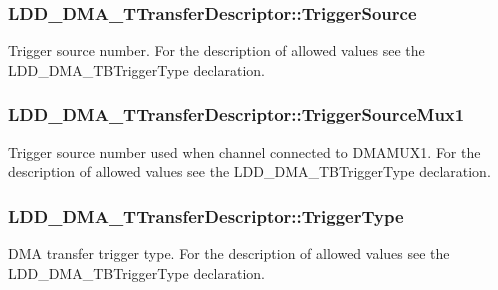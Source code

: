 \subsubsection[{Trigger\+Source}]{ L\+D\+D\+\_\+\+D\+M\+A\+\_\+\+T\+Transfer\+Descriptor\+::\+Trigger\+Source}\label{struct_l_d_d___d_m_a___t_transfer_descriptor_a770d0bde209b081eafe87892ed333084}
Trigger source number. For the description of allowed values see the L\+D\+D\+\_\+\+D\+M\+A\+\_\+\+T\+B\+Trigger\+Type declaration. \hypertarget{struct_l_d_d___d_m_a___t_transfer_descriptor_a6a9913a5c4727f786339ed8e84e8d5de}{}
\subsubsection[{Trigger\+Source\+Mux1}]{ L\+D\+D\+\_\+\+D\+M\+A\+\_\+\+T\+Transfer\+Descriptor\+::\+Trigger\+Source\+Mux1}\label{struct_l_d_d___d_m_a___t_transfer_descriptor_a6a9913a5c4727f786339ed8e84e8d5de}
Trigger source number used when channel connected to D\+M\+A\+M\+U\+X1. For the description of allowed values see the L\+D\+D\+\_\+\+D\+M\+A\+\_\+\+T\+B\+Trigger\+Type declaration. \hypertarget{struct_l_d_d___d_m_a___t_transfer_descriptor_a1d1ff275b5c883b0cad1b20ef1929716}{}
\subsubsection[{Trigger\+Type}]{ L\+D\+D\+\_\+\+D\+M\+A\+\_\+\+T\+Transfer\+Descriptor\+::\+Trigger\+Type}\label{struct_l_d_d___d_m_a___t_transfer_descriptor_a1d1ff275b5c883b0cad1b20ef1929716}
D\+M\+A transfer trigger type. For the description of allowed values see the L\+D\+D\+\_\+\+D\+M\+A\+\_\+\+T\+B\+Trigger\+Type declaration. \hypertarget{struct_l_d_d___d_m_a___t_transfer_descriptor_a4136d6742944c7b04a94695c78b581b8}{}
